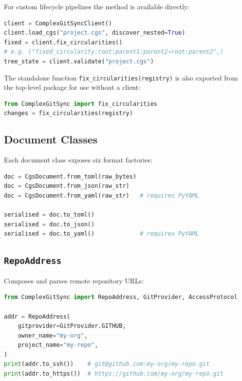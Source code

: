 For custom lifecycle pipelines the method is available directly:

\begin{lstlisting}[language=Python]
client = ComplexGitSyncClient()
client.load_cgs("project.cgs", discover_nested=True)
fixed = client.fix_circularities()
# e.g. ("fixed_circularity:root:parent1:parent2→root:parent2",)
tree_state = client.validate("project.cgs")
\end{lstlisting}

The standalone function \texttt{fix\_circularities(registry)} is also
exported from the top-level package for use without a client:

\begin{lstlisting}[language=Python]
from ComplexGitSync import fix_circularities
changes = fix_circularities(registry)
\end{lstlisting}

\subsection{Document Classes}

Each document class exposes six format factories:

\begin{lstlisting}[language=Python]
doc = CgsDocument.from_toml(raw_bytes)
doc = CgsDocument.from_json(raw_str)
doc = CgsDocument.from_yaml(raw_str)   # requires PyYAML

serialised = doc.to_toml()
serialised = doc.to_json()
serialised = doc.to_yaml()             # requires PyYAML
\end{lstlisting}

\subsection{\texttt{RepoAddress}}

Composes and parses remote repository URLs:

\begin{lstlisting}[language=Python]
from ComplexGitSync import RepoAddress, GitProvider, AccessProtocol

addr = RepoAddress(
    gitprovider=GitProvider.GITHUB,
    owner_name="my-org",
    project_name="my-repo",
)
print(addr.to_ssh())    # git@github.com:my-org/my-repo.git
print(addr.to_https())  # https://github.com/my-org/my-repo.git
\end{lstlisting}

